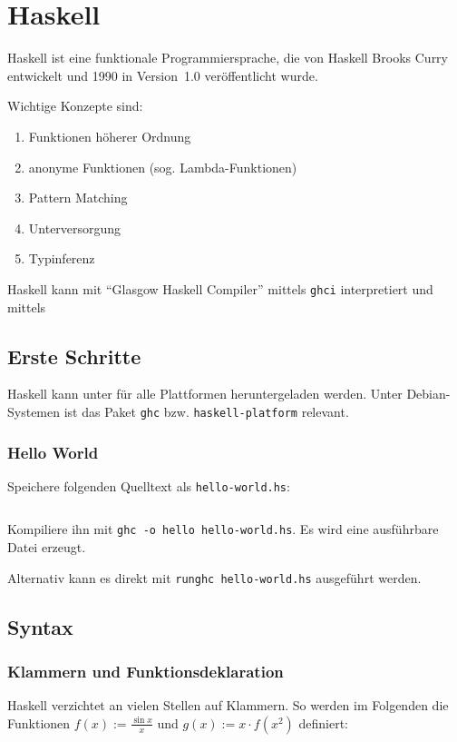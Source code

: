 \chapter{Haskell}
Haskell ist eine funktionale Programmiersprache, die von Haskell 
Brooks Curry entwickelt und 1990 in Version~1.0 veröffentlicht 
wurde.

Wichtige Konzepte sind:
\begin{enumerate}
    \item Funktionen höherer Ordnung
    \item anonyme Funktionen (sog. Lambda-Funktionen)
    \item Pattern Matching
    \item Unterversorgung
    \item Typinferenz
\end{enumerate}

Haskell kann mit \enquote{Glasgow Haskell Compiler} mittels 
\texttt{ghci} interpretiert und mittels 

\section{Erste Schritte}
Haskell kann unter \href{http://www.haskell.org/platform/}{}
für alle Plattformen heruntergeladen werden. Unter Debian-Systemen
ist das Paket \texttt{ghc} bzw. \texttt{haskell-platform} relevant.

\subsection{Hello World}
Speichere folgenden Quelltext als \texttt{hello-world.hs}:
\inputminted[linenos, numbersep=5pt, tabsize=4, frame=lines, label=hello-world.hs]{haskell}{scripts/haskell/hello-world.hs}

Kompiliere ihn mit \texttt{ghc -o hello hello-world.hs}. Es wird eine
ausführbare Datei erzeugt.

Alternativ kann es direkt mit \texttt{runghc hello-world.hs} ausgeführt werden.

\section{Syntax}
\subsection{Klammern und Funktionsdeklaration}
Haskell verzichtet an vielen Stellen auf Klammern. So werden im
Folgenden die Funktionen $f(x) := \frac{\sin x}{x}$ und $g(x) := x \cdot f(x^2)$
definiert:

